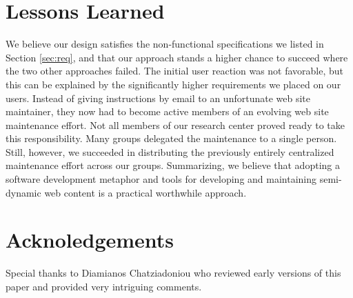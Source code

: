 \documentclass[10pt]{article}
\begin{document}
\section{Lessons Learned}
\label{sec:concl}
We believe our design satisfies the non-functional specifications
we listed in Section \ref{sec:req},
and that our approach stands a higher chance to succeed where the
two other approaches failed.
The initial user reaction was not favorable, but this can
be explained by the significantly higher requirements we
placed on our users.
Instead of giving instructions by email to an unfortunate
web site maintainer, they now had to become active members
of an evolving web site maintenance effort.
Not all members of our research center proved ready to take
this responsibility.
Many groups delegated the maintenance to a single person.
Still, however, we succeeded in distributing the previously
entirely centralized maintenance effort across our groups.
Summarizing, we believe that adopting a software development
metaphor and tools for developing and maintaining semi-dynamic
web content is a practical worthwhile approach.

\section{Acknoledgements}
\label{sec:ack}

Special thanks to Diamianos Chatziadoniou who reviewed early versions of this paper and provided very intriguing comments.



\end{document}
